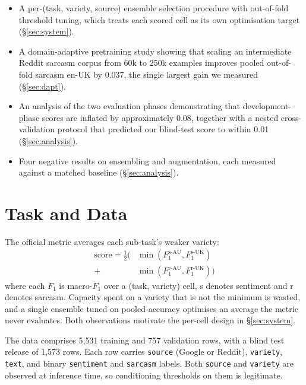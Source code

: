 \documentclass[11pt]{article}
\begin{document}
\begin{itemize}\setlength{\itemsep}{0.1ex}
\item A per-(task, variety, source) ensemble selection procedure with
out-of-fold threshold tuning, which treats each scored cell as its own
optimisation target (\S\ref{sec:system}).
\item A domain-adaptive pretraining study showing that scaling an intermediate
Reddit sarcasm corpus from 60k to 250k examples improves pooled out-of-fold
sarcasm en-UK by 0.037, the single largest gain we measured (\S\ref{sec:dapt}).
\item An analysis of the two evaluation phases demonstrating that
development-phase scores are inflated by approximately 0.08, together with a
nested cross-validation protocol that predicted our blind-test score to within
0.01 (\S\ref{sec:analysis}).
\item Four negative results on ensembling and augmentation, each measured
against a matched baseline (\S\ref{sec:analysis}).
\end{itemize}

\section{Task and Data}

The official metric averages each sub-task's weaker variety:
\begin{equation*}
\begin{aligned}
\text{score} = \tfrac{1}{2}\big(&\min(F_1^{\text{s-AU}}, F_1^{\text{s-UK}})\\
 +\ &\min(F_1^{\text{r-AU}}, F_1^{\text{r-UK}})\big)
\end{aligned}
\end{equation*}
where each $F_1$ is macro-$F_1$ over a (task, variety) cell, s denotes
sentiment and r denotes sarcasm. Capacity spent on a variety that is not the
minimum is wasted, and a single ensemble tuned on pooled accuracy optimises an
average the metric never evaluates. Both observations motivate the per-cell
design in \S\ref{sec:system}.

The data comprises 5{,}531 training and 757 validation rows, with a blind test
release of 1{,}573 rows. Each row carries \texttt{source} (Google or Reddit),
\texttt{variety}, \texttt{text}, and binary \texttt{sentiment} and
\texttt{sarcasm} labels. Both \texttt{source} and \texttt{variety} are
observed at inference time, so conditioning thresholds on them is legitimate.
\end{document}
